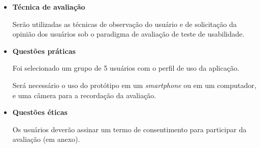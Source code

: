 \begin{itemize}
	   \item \textbf{Técnica de avaliação}
	      
	      \subitem 
		Serão utilizadas as técnicas de observação do usuário e de solicitação da opinião dos usuários
		sob o paradigma de avaliação de teste de usabilidade.
	      
	   \item \textbf{Questões práticas}
	      
	      \subitem Foi selecionado um grupo de 5 usuários com o perfil de uso da aplicação.
	      
	      \subitem Será necessário o uso do protótipo em um \textit{smartphone} ou em um computador, e uma câmera para 
	      a recordação da avaliação.
	      
	   \item \textbf{Questões éticas}
	      
	      \subitem 
		Os usuários deverão assinar um termo de consentimento para participar da avaliação (em anexo).
	      
	  \end{itemize}
	
	
